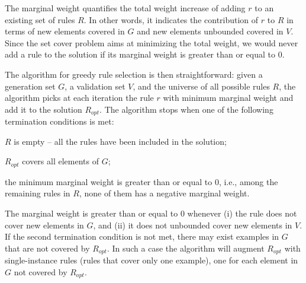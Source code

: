 The marginal weight quantifies the total weight increase of adding $r$ to an existing set of rules $R$. In other words, it indicates the contribution of $r$ to $R$ in terms of new elements covered in $G$ and new elements unbounded covered in $V$. 
Since the set cover problem aims at minimizing the total weight, we would never add a rule to the solution if its marginal weight is greater than or equal to $0$.

%

The algorithm for greedy rule selection is then straightforward:
given a generation set $G$, a validation set $V$, and the universe of all possible rules $R$, the algorithm picks at each iteration the rule $r$ with minimum marginal weight and add it to the solution $R_{opt}$.
The algorithm stops when one of the following termination conditions is met:
\begin{inparaenum} [\itshape1)]
	\item $R$ is empty -- all the rules have been included in the solution;
	\item $R_{opt}$ covers all elements of $G$;
	\item the minimum marginal weight is greater than or equal to $0$, i.e., among the remaining rules in $R$, none of them has a negative marginal weight.
\end{inparaenum}
The marginal weight is greater than or equal to $0$ whenever 
(i) the rule does not cover new elements in $G$, and (ii) it does not unbounded cover new elements in $V$. 
If the second termination condition is not met, there may exist examples in $G$ that are not covered by $R_{opt}$. In such a case the algorithm will augment $R_{opt}$ with single-instance rules (rules that cover only one example), one for each element in $G$ not covered by $R_{opt}$.


